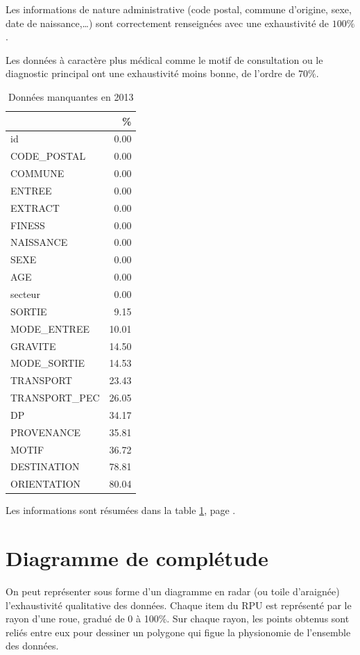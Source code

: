 \documentclass[12pt,english,french,twoside]{report}\usepackage[]{graphicx}\usepackage[]{color}
\begin{document}
Les informations de nature administrative (code postal, commune d'origine, sexe, date de naissance,\dots ) sont correctement renseignées avec une exhaustivité de $100\%$.

Les données à caractère plus médical comme le motif de consultation ou le diagnostic principal ont une exhaustivité moins bonne, de l'ordre de $70\%$.

\begin{table}[ht]
\centering
\begin{tabular}{|l|r|}
  \hline
 & \% \\ 
  \hline
id & 0.00 \\ 
  CODE\_POSTAL & 0.00 \\ 
  COMMUNE & 0.00 \\ 
  ENTREE & 0.00 \\ 
  EXTRACT & 0.00 \\ 
  FINESS & 0.00 \\ 
  NAISSANCE & 0.00 \\ 
  SEXE & 0.00 \\ 
  AGE & 0.00 \\ 
  secteur & 0.00 \\ 
  SORTIE & 9.15 \\ 
  MODE\_ENTREE & 10.01 \\ 
  GRAVITE & 14.50 \\ 
  MODE\_SORTIE & 14.53 \\ 
  TRANSPORT & 23.43 \\ 
  TRANSPORT\_PEC & 26.05 \\ 
  DP & 34.17 \\ 
  PROVENANCE & 35.81 \\ 
  MOTIF & 36.72 \\ 
  DESTINATION & 78.81 \\ 
  ORIENTATION & 80.04 \\ 
   \hline
\end{tabular}
\caption{Données manquantes en 2013} 
\label{tab2}
\end{table}



Les informations sont résumées dans la table \ref{tab2}, page \pageref{tab2}.

\section{Diagramme de complétude}

On peut représenter sous forme d'un diagramme en radar (ou toile d'araignée) l'exhaustivité qualitative des données. Chaque item du RPU est représenté par le rayon d'une roue, gradué de 0 à 100\%. Sur chaque rayon, les points obtenus sont reliés entre eux pour dessiner un polygone qui figue la physionomie de l'ensemble des données.
\end{document}
